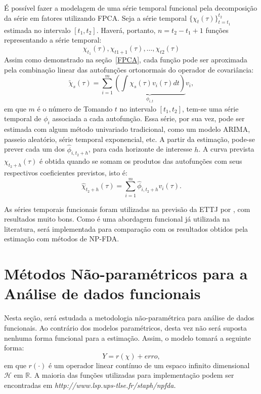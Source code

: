 \documentclass[
	12pt,				%
	openright,			%
	oneside,			%
	a4paper,			%
	english,			%
	brazil				%
	]{dissertacao-ufrgs-abntex2}
\begin{document}
É possível fazer a modelagem de uma série temporal funcional pela decomposição da série em fatores utilizando FPCA. Seja a série temporal $\{ \chi_t(\tau) \}_{t=t_1}^{t_2}$ estimada no  intervalo $[t_1,t_2]$. Haverá, portanto, $n=t_2-t_1+1$ funções representando a série temporal:
\begin{equation}
\chi_{t_1}(\tau), \chi_{t1+1}(\tau), \dots, \chi_{t2}(\tau)
\end{equation}
Assim como demonstrado na seção~\ref{FPCA}, cada função pode ser aproximada pela combinação linear das autofunções ortonormais do operador de covariância:
\begin{equation}
\widetilde{\chi}_s(\tau)=\sum_{i=1}^{m}{ \underbrace{ \left(  \int \chi_s(\tau)  v_i(\tau)dt \right) }_{\phi_{i,t}} } v_i,
\end{equation}
em que $m$ é o número de 
Tomando $t$ no intervalo $[t_1,t_2]$, tem-se uma série temporal de $\phi_i$ associada a cada autofunção. Essa série, por sua vez, pode ser estimada com algum método univariado tradicional, como um modelo ARIMA, passeio aleatório, série temporal exponencial, etc. A partir da estimação, pode-se prever cada um dos $\hat{\phi}_{i,t_2+h}$, para cada horizonte de interesse $h$. A curva prevista $\chi_{t_2+h}(\tau)$ é obtida quando se somam os produtos das autofunções com seus respectivos coeficientes previstos, isto é:
\begin{equation}
\hat{\chi}_{t_2+h}(\tau)= \sum_{i=1}^{m}{\hat{\phi}_{i,t_2+h} v_i(\tau) }.
\end{equation}

As séries temporais funcionais foram utilizadas na previsão da ETTJ por , com resultados muito bons. Como é uma abordagem funcional já utilizada na literatura, será implementada para comparação com os resultados obtidos pela estimação com métodos de NP-FDA.

\section{Métodos Não-paramétricos para a Análise de dados funcionais}

Nesta seção, será estudada a metodologia não-paramétrica para análise
de dados funcionais. Ao contrário dos modelos paramétricos, desta
vez não será suposta nenhuma forma funcional para a estimação. Assim,
o modelo tomará a seguinte forma:
\[
Y=r(\chi)+erro,
\]
em que $r(\cdot)$ é um operador linear contínuo de um espaco infinito dimensional $\mathcal{H}$
em $\mathbb{R}$. A maioria das funções utilizadas para implementação
podem ser encontradas em \emph{http://www.lsp.ups-tlse.fr/staph/npfda. }
\end{document}
